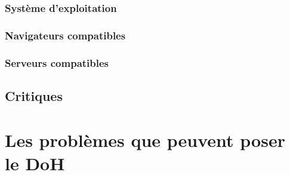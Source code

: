 \documentclass[a4paper,12pt]{article}
\begin{document}
	\subsubsection{Système d'exploitation}
	
	\subsubsection{Navigateurs compatibles}
	
	\subsubsection{Serveurs compatibles}
	
	\subsection{Critiques}
	
	\section{Les problèmes que peuvent poser le DoH}
	
	
	
\end{document}
